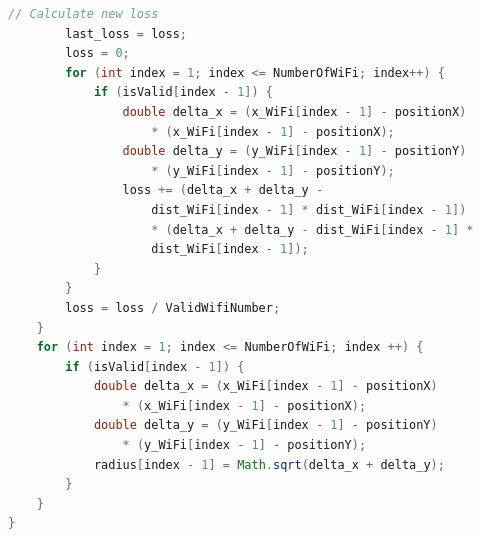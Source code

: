 \documentclass[12pt, a4paper]{article}
\theoremstyle{definition}
\begin{document}
\begin{lstlisting}[language=java]
        // Calculate new loss
        last_loss = loss;
        loss = 0;
        for (int index = 1; index <= NumberOfWiFi; index++) {
            if (isValid[index - 1]) {
                double delta_x = (x_WiFi[index - 1] - positionX)
                    * (x_WiFi[index - 1] - positionX);
                double delta_y = (y_WiFi[index - 1] - positionY) 
                    * (y_WiFi[index - 1] - positionY);
                loss += (delta_x + delta_y - 
                    dist_WiFi[index - 1] * dist_WiFi[index - 1]) 
                    * (delta_x + delta_y - dist_WiFi[index - 1] * 
                    dist_WiFi[index - 1]);
            }
        }
    	loss = loss / ValidWifiNumber;
    }
    for (int index = 1; index <= NumberOfWiFi; index ++) {
        if (isValid[index - 1]) {
            double delta_x = (x_WiFi[index - 1] - positionX) 
                * (x_WiFi[index - 1] - positionX);
            double delta_y = (y_WiFi[index - 1] - positionY) 
                * (y_WiFi[index - 1] - positionY);
            radius[index - 1] = Math.sqrt(delta_x + delta_y);
        }
    }
}
\end{lstlisting}
\end{document}
